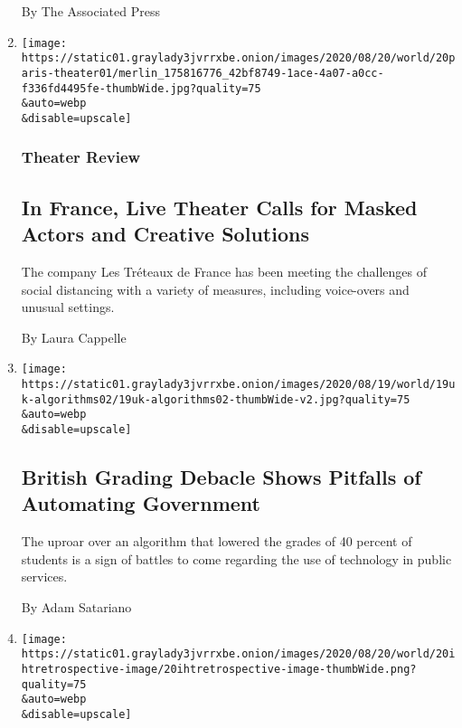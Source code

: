 \begin{enumerate}
  By The Associated Press
\item
  \href{/2020/08/20/theater/france-theater-coronavirus.html}{}

  \texttt{[image: https://static01.graylady3jvrrxbe.onion/images/2020/08/20/world/20paris-theater01/merlin\_175816776\_42bf8749-1ace-4a07-a0cc-f336fd4495fe-thumbWide.jpg?quality=75\\\&auto=webp\\\&disable=upscale]}

  \hypertarget{theater-review}{%
  \subsubsection{Theater Review}\label{theater-review}}

  \hypertarget{in-france-live-theater-calls-for-masked-actors-and-creative-solutions}{%
  \subsection{In France, Live Theater Calls for Masked Actors and
  Creative
  Solutions}\label{in-france-live-theater-calls-for-masked-actors-and-creative-solutions}}

  The company Les Tréteaux de France has been meeting the challenges of
  social distancing with a variety of measures, including voice-overs
  and unusual settings.

  By Laura Cappelle
\item
  \href{/2020/08/20/world/europe/uk-england-grading-algorithm.html}{}

  \texttt{[image: https://static01.graylady3jvrrxbe.onion/images/2020/08/19/world/19uk-algorithms02/19uk-algorithms02-thumbWide-v2.jpg?quality=75\\\&auto=webp\\\&disable=upscale]}

  \hypertarget{british-grading-debacle-shows-pitfalls-of-automating-government}{%
  \subsection{British Grading Debacle Shows Pitfalls of Automating
  Government}\label{british-grading-debacle-shows-pitfalls-of-automating-government}}

  The uproar over an algorithm that lowered the grades of 40 percent of
  students is a sign of battles to come regarding the use of technology
  in public services.

  By Adam Satariano
\item
  \href{/2020/08/20/world/asia/1970-man-hijacks-plane.html}{}

  \texttt{[image: https://static01.graylady3jvrrxbe.onion/images/2020/08/20/world/20ihtretrospective-image/20ihtretrospective-image-thumbWide.png?quality=75\\\&auto=webp\\\&disable=upscale]}


\end{enumerate}
